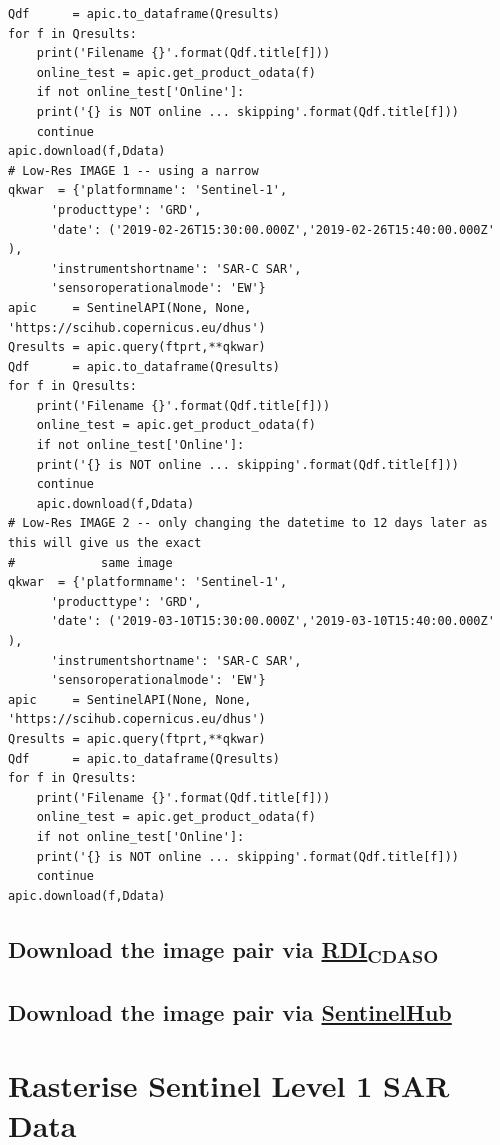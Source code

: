 \documentclass[11pt]{article}
\begin{document}
\begin{enumerate}
\begin{verbatim}
Qdf      = apic.to_dataframe(Qresults)
for f in Qresults:
    print('Filename {}'.format(Qdf.title[f]))
    online_test = apic.get_product_odata(f)
    if not online_test['Online']:
	print('{} is NOT online ... skipping'.format(Qdf.title[f]))
	continue
apic.download(f,Ddata)
# Low-Res IMAGE 1 -- using a narrow 
qkwar  = {'platformname': 'Sentinel-1',
	  'producttype': 'GRD',
	  'date': ('2019-02-26T15:30:00.000Z','2019-02-26T15:40:00.000Z' ),
	  'instrumentshortname': 'SAR-C SAR',
	  'sensoroperationalmode': 'EW'}
apic     = SentinelAPI(None, None, 'https://scihub.copernicus.eu/dhus')
Qresults = apic.query(ftprt,**qkwar)
Qdf      = apic.to_dataframe(Qresults)
for f in Qresults:
    print('Filename {}'.format(Qdf.title[f]))
    online_test = apic.get_product_odata(f)
    if not online_test['Online']:
	print('{} is NOT online ... skipping'.format(Qdf.title[f]))
	continue
    apic.download(f,Ddata)
# Low-Res IMAGE 2 -- only changing the datetime to 12 days later as this will give us the exact
#            same image
qkwar  = {'platformname': 'Sentinel-1',
	  'producttype': 'GRD',
	  'date': ('2019-03-10T15:30:00.000Z','2019-03-10T15:40:00.000Z' ),
	  'instrumentshortname': 'SAR-C SAR',
	  'sensoroperationalmode': 'EW'}
apic     = SentinelAPI(None, None, 'https://scihub.copernicus.eu/dhus')
Qresults = apic.query(ftprt,**qkwar)
Qdf      = apic.to_dataframe(Qresults)
for f in Qresults:
    print('Filename {}'.format(Qdf.title[f]))
    online_test = apic.get_product_odata(f)
    if not online_test['Online']:
	print('{} is NOT online ... skipping'.format(Qdf.title[f]))
	continue
apic.download(f,Ddata)
\end{verbatim}
\end{enumerate}

\subsection{Download the image pair via \href{file:///Users/dpath2o/PHD/admin/computing.org}{RDI\textsubscript{CDASO}}}
\label{sec:orgb81ca0a}
\subsection{Download the image pair via \href{https://apps.sentinel-hub.com/eo-browser/?zoom=10\&lat=41.9\&lng=12.5\&themeId=DEFAULT-THEME\&toTime=2022-04-13T20\%3A52\%3A55.350Z}{SentinelHub}}
\label{sec:org9d03bcf}

\section{Rasterise Sentinel Level 1 SAR Data}
\label{sec:orgeb29db6}
\end{document}
